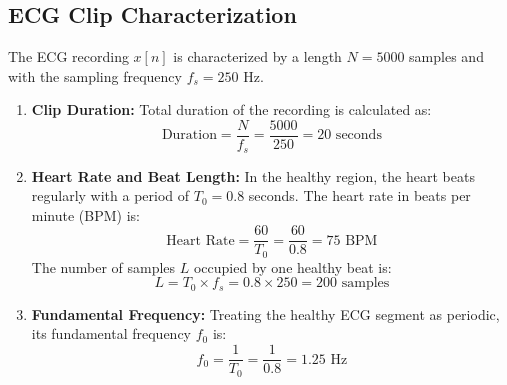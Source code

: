\documentclass[10pt, a4paper]{article}
\begin{document}
\subsection{ECG Clip Characterization}
The ECG recording $x[n]$ is characterized by a length $N = 5000$ samples and with the sampling frequency $f_s = 250$ Hz.
\begin{enumerate}
    \item \textbf{Clip Duration:} Total duration of the recording is calculated as:
    \begin{equation}
    \text{Duration} = \frac{N}{f_s} = \frac{5000}{250} = 20\text{ seconds}
    \end{equation}
    \item \textbf{Heart Rate and Beat Length:} In the healthy region, the heart beats regularly with a period of $T_0 = 0.8$ seconds. The heart rate in beats per minute (BPM) is:
    \begin{equation}
    \text{Heart Rate} = \frac{60}{T_0} = \frac{60}{0.8} = 75\text{ BPM}
    \end{equation}
    The number of samples $L$ occupied by one healthy beat is:
    \begin{equation}
    L = T_0 \times f_s = 0.8 \times 250 = 200\text{ samples}
    \end{equation}
    \item \textbf{Fundamental Frequency:} Treating the healthy ECG segment as periodic, its fundamental frequency $f_0$ is:
    \begin{equation}
    f_0 = \frac{1}{T_0} = \frac{1}{0.8} = 1.25\text{ Hz}
    \end{equation}
\end{enumerate}
\end{document}

